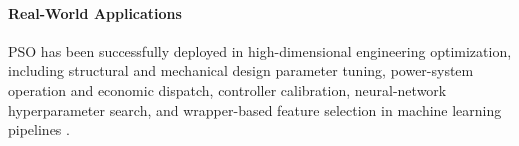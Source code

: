 \paragraph{Real-World Applications}
PSO has been successfully deployed in high-dimensional engineering optimization, including structural and mechanical design parameter tuning, power-system operation and economic dispatch, controller calibration, neural-network hyperparameter search, and wrapper-based feature selection in machine learning pipelines \autocite{WangEtAl2018PSO}.